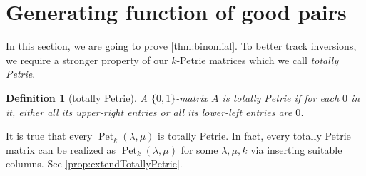 \documentclass[pdflatex,sn-mathphys-num]{sn-jnl}%
\theoremstyle{thmstyleone}%
\theoremstyle{thmstyletwo}%
\theoremstyle{thmstylethree}%
\newtheorem{definition}[theorem]{Definition}
\numberwithin{equation}{section}
\DeclareMathOperator{\Pet}{Pet}
\begin{document}
			

        
        
    \section{Generating function of good pairs}\label{sec:GenFunc}
        In this section, we are going to prove \cref{thm:binomial}. To better track inversions, we require a stronger property of our $k$-Petrie matrices which we call \textit{totally Petrie}.
        
        \begin{definition}[totally Petrie]
            A $\{0,1\}$-matrix $A$ is \textit{totally Petrie} if for each $0$ in it, either all its upper-right entries or all its lower-left entries are $0$. 
        \end{definition}
        It is true that every $\Pet_k(\lambda,\mu)$ is totally Petrie. In fact, every totally Petrie matrix can be realized as $\Pet_k(\lambda,\mu)$ for some $\lambda,\mu,k$ via inserting suitable columns. See \cref{prop:extendTotallyPetrie}.
        
\end{document}
